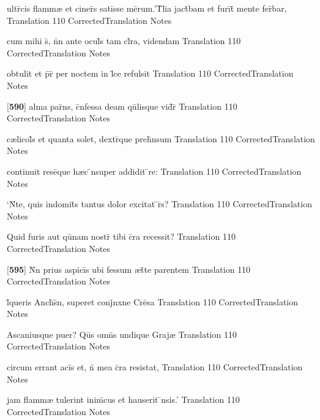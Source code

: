 \latline
  {ultr\={\macron {\i}}cis flamm{\ae} et ciner\={}s sati\={}sse me\={}rum.'T\={}lia jact\={}bam et furi\={}t\={} mente fer\={}bar,}
  { Translation }
  {110}
  { CorrectedTranslation }
  { Notes }


\latline
  {cum mihi s\={}, n\={}n ante ocul\={\macron {\i}}s tam cl\={}ra, videndam}
  { Translation }
  {110}
  { CorrectedTranslation }
  { Notes }


\latline
  {obtulit et p\={}r\={} per noctem in l\={}ce refulsit}
  { Translation }
  {110}
  { CorrectedTranslation }
  { Notes }


\latline
  {[\textbf{590}] alma par\={}ns, c\={}nfessa deam qu\={}lisque vid\={}r\={\macron {\i}}}
  { Translation }
  {110}
  { CorrectedTranslation }
  { Notes }


\latline
  {c{\ae}licol\={\macron {\i}}s et quanta solet, dextr\={}que preh\={}nsum}
  { Translation }
  {110}
  { CorrectedTranslation }
  { Notes }


\latline
  {continuit rese\={}que h{\ae}c \={\macron {\i}}nsuper addidit \={}re:}
  { Translation }
  {110}
  { CorrectedTranslation }
  { Notes }


\latline
  {`N\={}te, quis indomit\={}s tantus dolor excitat \={\macron {\i}}r\={}s?}
  { Translation }
  {110}
  { CorrectedTranslation }
  { Notes }


\latline
  {Quid furis aut qu\={}nam nostr\={\macron {\i}} tibi c\={}ra recessit?}
  { Translation }
  {110}
  { CorrectedTranslation }
  { Notes }


\latline
  {[\textbf{595}] N\={}n prius aspici\={}s ubi fessum {\ae}t\={}te parentem}
  { Translation }
  {110}
  { CorrectedTranslation }
  { Notes }


\latline
  {l\={\macron {\i}}queris Anch\={\macron {\i}}s\={}n, superet conj\={}nxne Cre\={}sa}
  { Translation }
  {110}
  { CorrectedTranslation }
  { Notes }


\latline
  {Ascaniusque puer?  Qu\={}s omn\={\macron {\i}}s undique Graj{\ae}}
  { Translation }
  {110}
  { CorrectedTranslation }
  { Notes }


\latline
  {circum errant aci\={}s et, n\={\macron {\i}} mea c\={}ra resistat,}
  { Translation }
  {110}
  { CorrectedTranslation }
  { Notes }


\latline
  {jam flamm{\ae} tulerint inim\={\macron {\i}}cus et hauserit \={}nsis.'}
  { Translation }
  {110}
  { CorrectedTranslation }
  { Notes }


